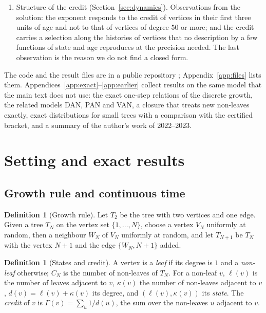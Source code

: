 \documentclass[11pt]{article}
\theoremstyle{plain}
\theoremstyle{definition}
\newtheorem{definition}[theorem]{Definition}
\theoremstyle{remark}
\begin{document}
\begin{enumerate}
\item Structure of the credit (Section~\ref{sec:dynamics}). Observations from the solution: the exponent responds to the credit of vertices in their first three units of age and not to that of vertices of degree $50$ or more; and the credit carries a selection along the histories of vertices that no description by a few functions of state and age reproduces at the precision needed. The last observation is the reason we do not find a closed form.
\end{enumerate}
The code and the result files are in a public repository \cite{Repo}; Appendix~\ref{app:files} lists them. Appendices~\ref{app:exact}--\ref{app:earlier} collect results on the same model that the main text does not use: the exact one-step relations of the discrete growth, the related models DAN, PAN and VAN, a closure that treats new non-leaves exactly, exact distributions for small trees with a comparison with the certified bracket, and a summary of the author's work of 2022--2023.

\section{Setting and exact results}\label{sec:exact}

\subsection{Growth rule and continuous time}

\begin{definition}[Growth rule]
Let $T_2$ be the tree with two vertices and one edge. Given a tree $T_N$ on the vertex set $\{1,\dots,N\}$, choose a vertex $V_N$ uniformly at random, then a neighbour $W_N$ of $V_N$ uniformly at random, and let $T_{N+1}$ be $T_N$ with the vertex $N+1$ and the edge $\{W_N,N+1\}$ added.
\end{definition}

\begin{definition}[States and credit]
A vertex is a \emph{leaf} if its degree is $1$ and a \emph{non-leaf} otherwise; $C_N$ is the number of non-leaves of $T_N$. For a non-leaf $v$, $\ell(v)$ is the number of leaves adjacent to $v$, $\kappa(v)$ the number of non-leaves adjacent to $v$, $d(v)=\ell(v)+\kappa(v)$ its degree, and $(\ell(v),\kappa(v))$ its \emph{state}. The \emph{credit} of $v$ is $\Gamma(v)=\sum_{u}1/d(u)$, the sum over the non-leaves $u$ adjacent to $v$.
\end{definition}
\end{document}
